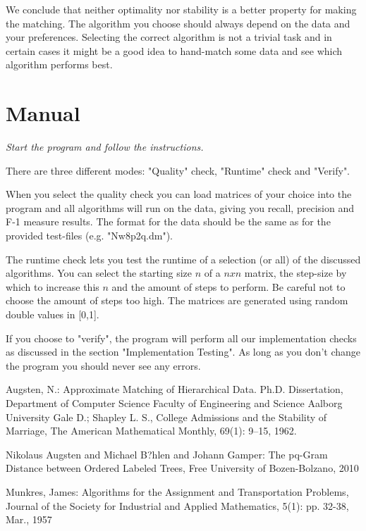 \documentclass[a4paper,11pt]{article}
\begin{document}
We conclude that neither optimality nor stability is a better property for making the matching. The algorithm you choose should always depend on the data and your preferences. Selecting the correct algorithm is not a trivial task and in certain cases it might be a good idea to hand-match some data and see which algorithm performs best.

\section{Manual}

\textit{Start the program and follow the instructions.}

There are three different modes: "Quality" check, "Runtime" check and "Verify".

When you select the quality check you can load matrices of your choice into the program and all algorithms will run on the data, giving you recall, precision and F-1 measure results. The format for the data should be the same as for the provided test-files (e.g. "Nw8p2q.dm").

The runtime check lets you test the runtime of a selection (or all) of the discussed algorithms. You can select the starting size $n$ of a $nxn$ matrix, the step-size by which to increase this $n$ and the amount of steps to perform. Be careful not to choose the amount of steps too high. The matrices are generated using random double values in [0,1].

If you choose to "verify", the program will perform all our implementation checks as discussed in the section "Implementation Testing". As long as you don't change the program you should never see any errors.


\begin{thebibliography}{9999}
Augsten, N.: Approximate Matching of Hierarchical Data. 
Ph.D. Dissertation, Department of Computer Science Faculty of Engineering and Science Aalborg University
Gale D.; Shapley L. S., College Admissions and the Stability of Marriage, The American Mathematical Monthly,  69(1): 9–15, 1962.

Nikolaus Augsten and Michael B?hlen and Johann Gamper: The pq-Gram Distance between Ordered Labeled Trees, Free University of Bozen-Bolzano, 2010 

Munkres, James: Algorithms for the Assignment and Transportation Problems, Journal of the Society for Industrial and Applied Mathematics, 5(1): pp. 32-38, Mar., 1957

\end{thebibliography}
\end{document}
